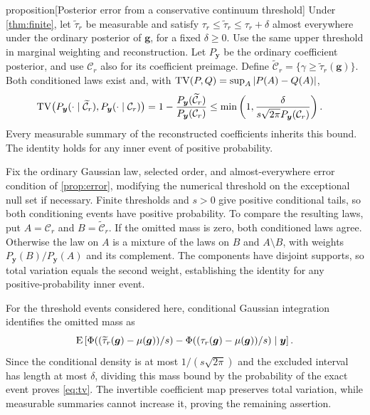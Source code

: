 \begin{theoremEnd}[combined main,category=error]{proposition}[Posterior error from a conservative continuum threshold]
\label{prop:error}
Under \cref{thm:finite}, let $\widetilde\tau_r$ be measurable and satisfy
$\tau_r\leq\widetilde\tau_r\leq\tau_r+\delta$ almost everywhere
under the ordinary posterior of $\boldsymbol g$, for a fixed $\delta\geq0$.
Use the same upper threshold in marginal weighting and reconstruction.
Let $P_{\boldsymbol y}$ be the ordinary coefficient posterior, and use
$\mathcal C_r$ also for its coefficient preimage. Define
$\widetilde{\mathcal C}_r=\{\gamma\geq\widetilde\tau_r(\boldsymbol g)\}$.
Both conditioned laws exist and, with $\operatorname{TV}(P,Q)=\sup_A|P(A)-Q(A)|$,
\begin{equation}\label{eq:tv}
 \begin{split}
 \operatorname{TV}\bigl(P_{\boldsymbol y}(\cdot\mid\widetilde{\mathcal C}_r),
          P_{\boldsymbol y}(\cdot\mid\mathcal C_r)\bigr)
 &=1-\frac{P_{\boldsymbol y}(\widetilde{\mathcal C}_r)}
                 {P_{\boldsymbol y}(\mathcal C_r)}
 \leq\min\left(1,\frac{\delta}
 {s\sqrt{2\pi}P_{\boldsymbol y}(\mathcal C_r)}\right).
 \end{split}
\end{equation}
Every measurable summary of the reconstructed coefficients inherits
this bound. The identity holds for any inner event of positive probability.
\end{theoremEnd}
\begin{proofEnd}
Fix the ordinary Gaussian law, selected order, and almost-everywhere
error condition of \cref{prop:error}, modifying the numerical threshold
on the exceptional null set if necessary. Finite thresholds and $s>0$
give positive conditional tails, so both conditioning events have
positive probability. To compare the resulting laws, put
$A=\mathcal C_r$ and $B=\widetilde{\mathcal C}_r$. If the omitted
mass is zero, both conditioned laws agree. Otherwise the law on $A$
is a mixture of the laws on $B$ and $A\setminus B$, with weights
$P_{\boldsymbol y}(B)/P_{\boldsymbol y}(A)$ and its complement.
The components have disjoint supports, so total variation equals the
second weight, establishing the identity for any positive-probability
inner event.

For the threshold events considered here, conditional
Gaussian integration identifies the omitted mass as
\[
 \operatorname{E}\left[\Phi((\widetilde\tau_r(\boldsymbol g)-\mu(\boldsymbol g))/s)
          -\Phi((\tau_r(\boldsymbol g)-\mu(\boldsymbol g))/s)
          \mid\boldsymbol y\right].
\]
Since the conditional density is at most $1/(s\sqrt{2\pi})$ and the
excluded interval has length at most $\delta$, dividing this mass
bound by the probability of the exact event proves \cref{eq:tv}.
The invertible coefficient map preserves total variation, while
measurable summaries cannot increase it, proving the remaining assertion.
\end{proofEnd}
